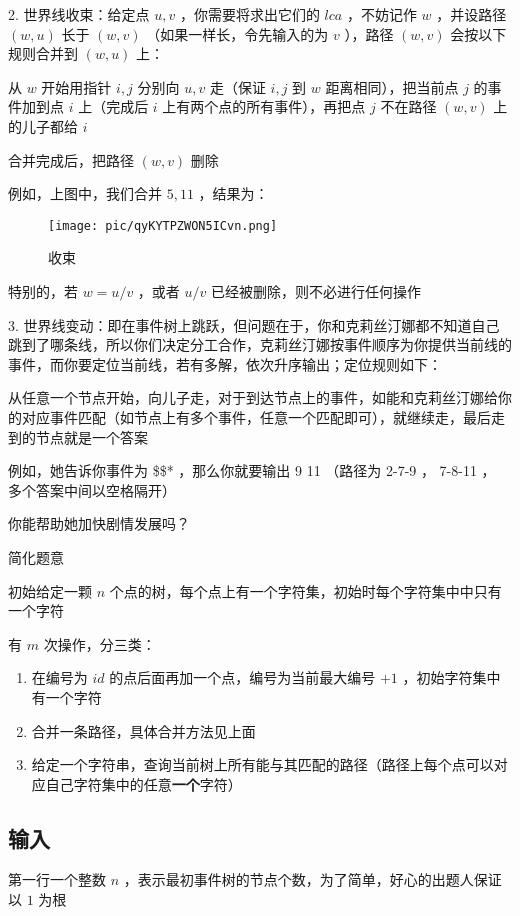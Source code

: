 \documentclass[UTF8]{ctexart}
\begin{document}
2. 世界线收束：给定点 $u, v$ ，你需要将求出它们的 $lca$ ，不妨记作 $w$ ，并设路径 $(w, u)$  长于 $(w, v)$ （如果一样长，令先输入的为 $v$ ），路径 $(w, v)$ 会按以下规则合并到 $(w, u)$ 上：

   从 $w$ 开始用指针 $i, j$ 分别向 $u, v$ 走（保证 $i, j$ 到 $w$ 距离相同），把当前点 $j$ 的事件加到点 $i$ 上（完成后 $i$ 上有两个点的所有事件），再把点 $j$  不在路径 $(w, v)$ 上的儿子都给 $i$ 

   合并完成后，把路径 $(w, v)$ 删除

   例如，上图中，我们合并 $5, 11$ ，结果为：

\begin{figure}[h]
    \centering
    \texttt{[image: pic/qyKYTPZWON5ICvn.png]}
    \caption{收束}
    \label{fig:enter-label}
\end{figure}

\newpage

   特别的，若 $w = u/v$ ，或者 $u/v$ 已经被删除，则不必进行任何操作 

3. 世界线变动：即在事件树上跳跃，但问题在于，你和克莉丝汀娜都不知道自己跳到了哪条线，所以你们决定分工合作，克莉丝汀娜按事件顺序为你提供当前线的事件，而你要定位当前线，若有多解，依次升序输出；定位规则如下：

   从任意一个节点开始，向儿子走，对于到达节点上的事件，如能和克莉丝汀娜给你的对应事件匹配（如节点上有多个事件，任意一个匹配即可），就继续走，最后走到的节点就是一个答案

   例如，她告诉你事件为 \$\$* ，那么你就要输出 9 11 （路径为 2-7-9 ， 7-8-11 ， 多个答案中间以空格隔开）

你能帮助她加快剧情发展吗？

\vspace{5mm}
简化题意

初始给定一颗 $n$ 个点的树，每个点上有一个字符集，初始时每个字符集中中只有一个字符

有 $m$ 次操作，分三类：

\begin{enumerate}
    \item{在编号为 $id$ 的点后面再加一个点，编号为当前最大编号 $+ 1$ ，初始字符集中有一个字符}
    \item{合并一条路径，具体合并方法见上面}
    \item{给定一个字符串，查询当前树上所有能与其匹配的路径（路径上每个点可以对应自己字符集中的任意\textbf{一个}字符）}
\end{enumerate}

\subsection{输入}
第一行一个整数 $n$ ，表示最初事件树的节点个数，为了简单，好心的出题人保证以 $1$ 为根
\end{document}
